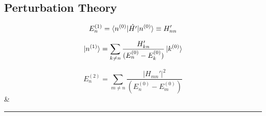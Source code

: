 \documentclass[table,cmyk]{article}
\begin{document}
\begin{longtable}
\section*{Perturbation Theory}
\[E_n^{(1)} = \braket{n^{(0)}|\hat{H'}|n^{(0)}} \equiv H_{nn}'\]

\[ \ket{n^{(1)}} = \sum_{k\ne n} \frac{H_{kn}'}{(E_n^{(0)}-E_k^{(0)})}\ket{k^{(0)}}\]

\[E_n^{(2)} = \sum_{m\ne n} \frac{|H_{mn}'|^2}{(E_n^{(0)}-E_m^{(0)})}\]
&

\noindent\rule{7.8cm}{0.4pt}

\tabularnewline\hline
\end{longtable}
\end{document}
